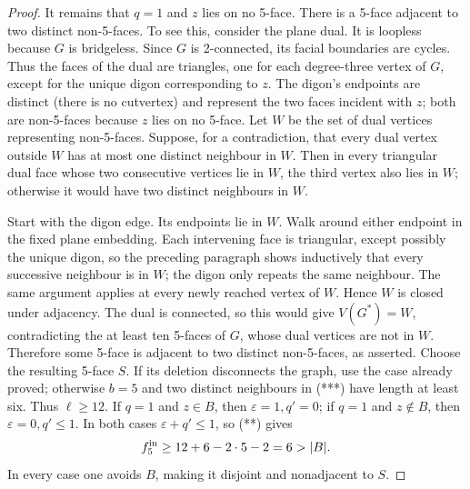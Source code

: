 \documentclass[11pt]{article}
\theoremstyle{remark}
\numberwithin{equation}{section}
\numberwithin{table}{section}
\begin{document}
\begin{proof}
It remains that $q=1$ and $z$ lies on no 5-face. There is a 5-face adjacent
to two distinct non-5-faces. To see this, consider the plane dual.
It is loopless because $G$ is bridgeless.  Since $G$ is 2-connected,
its facial boundaries are cycles.  Thus the faces of the dual are
triangles, one for each degree-three vertex of $G$, except for the
unique digon corresponding to $z$.  The digon's endpoints are
distinct (there is no cutvertex) and represent the two faces incident
with $z$; both are
non-5-faces because $z$ lies on no 5-face.  Let $W$ be the set of
dual vertices representing non-5-faces.  Suppose, for a contradiction,
that every dual vertex outside $W$ has at most one distinct neighbour
in $W$.  Then in every triangular dual face whose two consecutive
vertices lie in $W$, the third vertex also lies in $W$; otherwise it
would have two distinct neighbours in $W$.

Start with the digon edge.  Its endpoints lie in $W$.  Walk around
either endpoint in the fixed plane embedding.  Each intervening face
is triangular, except possibly the unique digon, so the preceding
paragraph shows inductively that every successive neighbour is in
$W$; the digon only repeats the same neighbour.  The same argument
applies at every newly reached vertex of $W$.  Hence $W$ is closed
under adjacency.  The dual is connected, so this would give
$V(G^*)=W$, contradicting the at least ten 5-faces of $G$, whose dual
vertices are not in $W$.  Therefore some 5-face is adjacent to two
distinct non-5-faces, as asserted.
Choose the resulting 5-face $S$. If its deletion disconnects the graph,
use the case already proved; otherwise $b=5$ and two distinct
neighbours in (***) have length at least six.  Thus $\ell\ge12$.
If $q=1$ and $z\in B$, then $\varepsilon=1,q'=0$; if
$q=1$ and $z\notin B$, then $\varepsilon=0,q'\le1$.  In both cases
$\varepsilon+q'\le1$, so (**)
gives
\[
 f^{\rm in}_5\ge12+6-2\cdot5-2=6>|B|.
\]
In every case one avoids $B$, making it disjoint and nonadjacent to $S$.
\end{proof}
\end{document}
